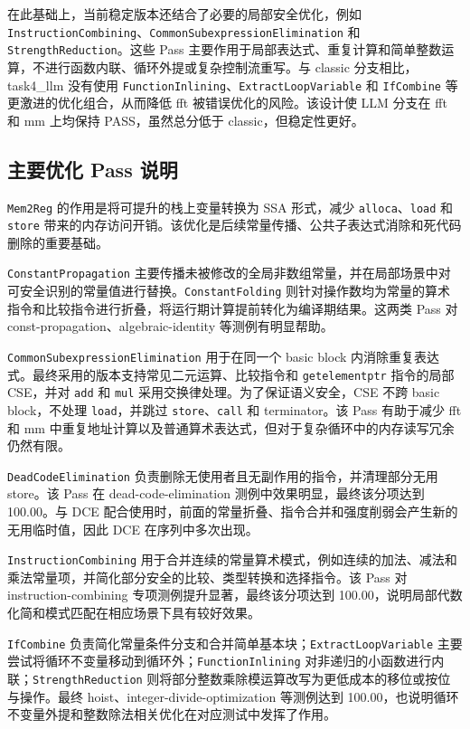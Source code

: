 在此基础上，当前稳定版本还结合了必要的局部安全优化，例如 \texttt{InstructionCombining}、\texttt{CommonSubexpressionElimination} 和 \texttt{StrengthReduction}。这些 Pass 主要作用于局部表达式、重复计算和简单整数运算，不进行函数内联、循环外提或复杂控制流重写。与 classic 分支相比，task4\_llm 没有使用 \texttt{FunctionInlining}、\texttt{ExtractLoopVariable} 和 \texttt{IfCombine} 等更激进的优化组合，从而降低 fft 被错误优化的风险。该设计使 LLM 分支在 fft 和 mm 上均保持 PASS，虽然总分低于 classic，但稳定性更好。

\subsection{主要优化 Pass 说明}

\texttt{Mem2Reg} 的作用是将可提升的栈上变量转换为 SSA 形式，减少 \texttt{alloca}、\texttt{load} 和 \texttt{store} 带来的内存访问开销。该优化是后续常量传播、公共子表达式消除和死代码删除的重要基础。

\texttt{ConstantPropagation} 主要传播未被修改的全局非数组常量，并在局部场景中对可安全识别的常量值进行替换。\texttt{ConstantFolding} 则针对操作数均为常量的算术指令和比较指令进行折叠，将运行期计算提前转化为编译期结果。这两类 Pass 对 const-propagation、algebraic-identity 等测例有明显帮助。

\texttt{CommonSubexpressionElimination} 用于在同一个 basic block 内消除重复表达式。最终采用的版本支持常见二元运算、比较指令和 \texttt{getelementptr} 指令的局部 CSE，并对 \texttt{add} 和 \texttt{mul} 采用交换律处理。为了保证语义安全，CSE 不跨 basic block，不处理 \texttt{load}，并跳过 \texttt{store}、\texttt{call} 和 terminator。该 Pass 有助于减少 fft 和 mm 中重复地址计算以及普通算术表达式，但对于复杂循环中的内存读写冗余仍然有限。

\texttt{DeadCodeElimination} 负责删除无使用者且无副作用的指令，并清理部分无用 store。该 Pass 在 dead-code-elimination 测例中效果明显，最终该分项达到 100.00。与 DCE 配合使用时，前面的常量折叠、指令合并和强度削弱会产生新的无用临时值，因此 DCE 在序列中多次出现。

\texttt{InstructionCombining} 用于合并连续的常量算术模式，例如连续的加法、减法和乘法常量项，并简化部分安全的比较、类型转换和选择指令。该 Pass 对 instruction-combining 专项测例提升显著，最终该分项达到 100.00，说明局部代数化简和模式匹配在相应场景下具有较好效果。

\texttt{IfCombine} 负责简化常量条件分支和合并简单基本块；\texttt{ExtractLoopVariable} 主要尝试将循环不变量移动到循环外；\texttt{FunctionInlining} 对非递归的小函数进行内联；\texttt{StrengthReduction} 则将部分整数乘除模运算改写为更低成本的移位或按位与操作。最终 hoist、integer-divide-optimization 等测例达到 100.00，也说明循环不变量外提和整数除法相关优化在对应测试中发挥了作用。

